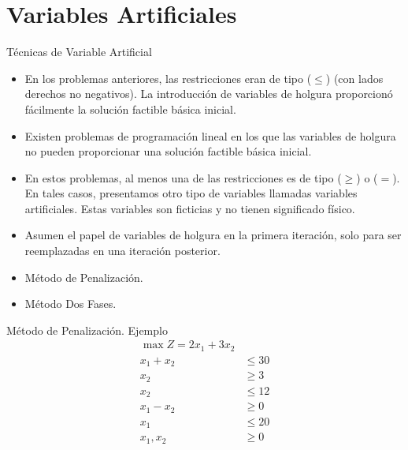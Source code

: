 
\section{Variables Artificiales}
\label{sec:artificial-variables}


\begin{frame}{Técnicas de Variable Artificial}
  \begin{itemize} \parskip3mm \justifying
  \item<only@1> En los problemas anteriores, las restricciones eran de tipo ($\leq$) (con lados derechos no negativos). La introducción de variables de holgura proporcionó fácilmente la solución factible básica inicial. 
  \item<only@1> Existen  problemas de programación lineal en los que las \alert{variables de holgura no pueden proporcionar una solución factible básica inicial.} 
  \item<only@1> En estos problemas, \alert{al menos una de las restricciones es de tipo ($\geq$) o ($=$)}. En tales casos, presentamos otro tipo de variables llamadas \alert{variables artificiales}. Estas variables son ficticias y no tienen significado físico. 
  \item<only@1> Asumen el papel de \alert{variables de holgura en la primera iteración}, solo para ser \alert{reemplazadas en una iteración posterior. }
  \item<only@2> Método de Penalización.
  \item<only@2> Método Dos Fases.   
  \end{itemize}
\end{frame}

\begin{frame}{Método de Penalización. Ejemplo}{}
  \begin{align*}
    \max Z = 2x_1 + 3x_2 & \\[5mm]
    x_1 + x_2 & \leq 30\\
    x_2 & \geq 3\\
    x_2 & \leq 12\\
    x_1 - x_2 & \geq 0\\
    x_1  & \leq 20 \\[5mm]
    x_1, x_2 & \geq 0
  \end{align*}  
\end{frame}



